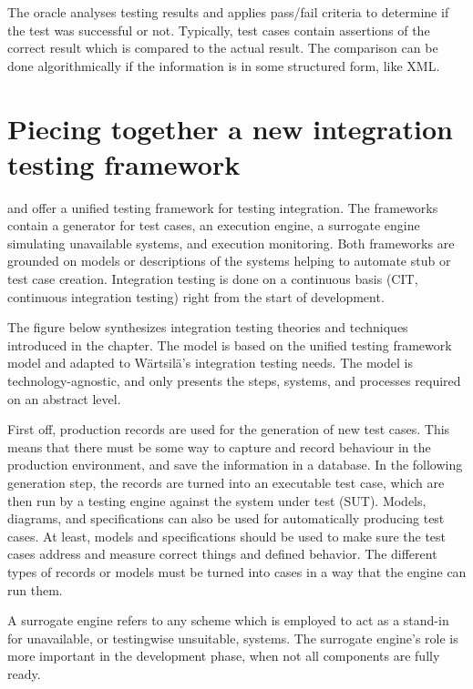 \documentclass[12pt,a4paper,oneside,pdftex]{report}
\begin{document}
{The oracle analyses testing results and applies pass/fail criteria to determine if the test was successful or not. Typically, test cases contain assertions of the correct result which is compared to the actual result. The comparison can be done algorithmically if the information is in some structured form, like XML.

\chapter{Piecing together a new integration testing framework}
\label{chapter:newframework}

\citet{huang2008surrogate} and \citet{liu2009unified} offer a unified testing framework for testing integration. The frameworks contain a generator for test cases, an execution engine, a surrogate engine simulating unavailable systems, and execution monitoring. Both frameworks are grounded on models or descriptions of the systems helping to automate stub or test case creation. Integration testing is done on a continuous basis (CIT, continuous integration testing) right from the start of development.

The figure below synthesizes integration testing theories and techniques introduced in the chapter. The model is based on the \citet{liu2009unified} unified testing framework model and adapted to Wärtsilä's integration testing needs. The model is technology-agnostic, and only presents the steps, systems, and processes required on an abstract level.

First off, production records are used for the generation of new test cases. This means that there must be some way to capture and record behaviour in the production environment, and save the information in a database. In the following generation step, the records are turned into an executable test case, which are then run by a testing engine against the system under test (SUT). Models, diagrams, and specifications can also be used for automatically producing test cases. At least, models and specifications should be used to make sure the test cases address and measure correct things and defined behavior. The different types of records or models must be turned into cases in a way that the engine can run them. 

A surrogate engine refers to any scheme which is employed to act as a stand-in for unavailable, or testingwise unsuitable, systems. The surrogate engine's role is more important in the development phase, when not all components are fully ready.

}
\end{document}

